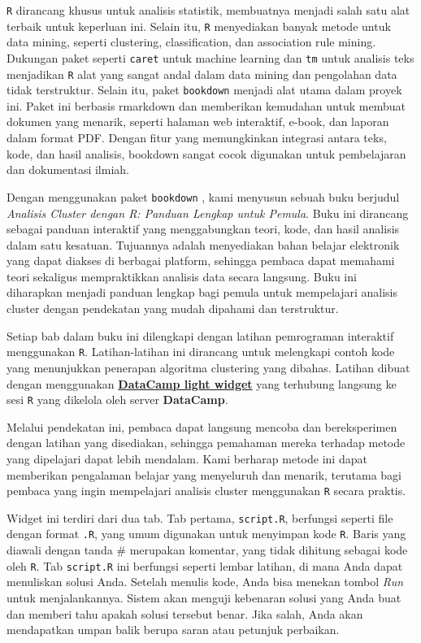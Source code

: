 \documentclass[
  oneside]{book}
\begin{document}
\texttt{R} dirancang khusus untuk analisis statistik, membuatnya
menjadi salah satu alat terbaik untuk keperluan ini. Selain itu,
\texttt{R} menyediakan banyak metode untuk data mining, seperti
clustering, classification, dan association rule mining. Dukungan paket
seperti \texttt{caret} untuk machine learning dan \texttt{tm} untuk analisis teks
menjadikan \texttt{R} alat yang sangat andal dalam data mining dan
pengolahan data tidak terstruktur. Selain itu, paket \texttt{bookdown} menjadi
alat utama dalam proyek ini. Paket ini berbasis rmarkdown dan memberikan
kemudahan untuk membuat dokumen yang menarik, seperti halaman web
interaktif, e-book, dan laporan dalam format PDF. Dengan fitur yang
memungkinkan integrasi antara teks, kode, dan hasil analisis, bookdown
sangat cocok digunakan untuk pembelajaran dan dokumentasi ilmiah.

Dengan menggunakan paket \texttt{bookdown} , kami menyusun sebuah buku berjudul
\emph{Analisis Cluster dengan R: Panduan Lengkap untuk Pemula}. Buku ini
dirancang sebagai panduan interaktif yang menggabungkan teori, kode, dan
hasil analisis dalam satu kesatuan. Tujuannya adalah menyediakan bahan
belajar elektronik yang dapat diakses di berbagai platform, sehingga
pembaca dapat memahami teori sekaligus mempraktikkan analisis data
secara langsung. Buku ini diharapkan menjadi panduan lengkap bagi pemula
untuk mempelajari analisis cluster dengan pendekatan yang mudah dipahami
dan terstruktur.

Setiap bab dalam buku ini dilengkapi dengan latihan pemrograman
interaktif menggunakan \texttt{R}. Latihan-latihan ini dirancang
untuk melengkapi contoh kode yang menunjukkan penerapan algoritma
clustering yang dibahas. Latihan dibuat dengan menggunakan \href{https://github.com/datacamp/datacamp-light}{\textbf{DataCamp
light widget}} yang
terhubung langsung ke sesi \texttt{R} yang dikelola oleh server
\textbf{DataCamp}.

Melalui pendekatan ini, pembaca dapat langsung mencoba dan bereksperimen
dengan latihan yang disediakan, sehingga pemahaman mereka terhadap
metode yang dipelajari dapat lebih mendalam. Kami berharap metode ini
dapat memberikan pengalaman belajar yang menyeluruh dan menarik,
terutama bagi pembaca yang ingin mempelajari analisis cluster
menggunakan \texttt{R} secara praktis.

Widget ini terdiri dari dua tab. Tab pertama, \texttt{script.R},
berfungsi seperti file dengan format \texttt{.R}, yang umum
digunakan untuk menyimpan kode \texttt{R}. Baris yang diawali
dengan tanda \# merupakan komentar, yang tidak dihitung sebagai kode
oleh \texttt{R}. Tab \texttt{script.R} ini berfungsi seperti lembar
latihan, di mana Anda dapat menuliskan solusi Anda. Setelah menulis
kode, Anda bisa menekan tombol \emph{Run} untuk menjalankannya. Sistem akan
menguji kebenaran solusi yang Anda buat dan memberi tahu apakah solusi
tersebut benar. Jika salah, Anda akan mendapatkan umpan balik berupa
saran atau petunjuk perbaikan.
\end{document}
